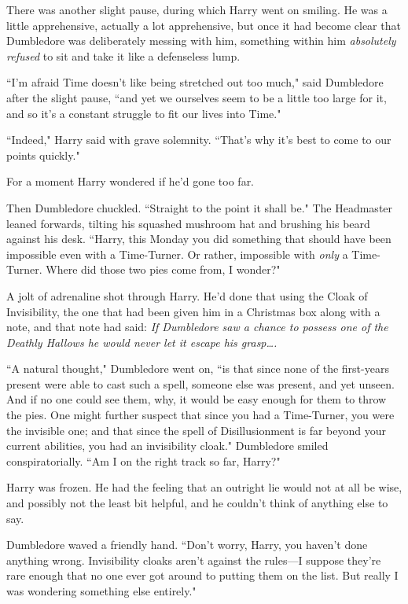 There was another slight pause, during which Harry went on smiling. He was a little apprehensive, actually a lot apprehensive, but once it had become clear that Dumbledore was deliberately messing with him, something within him \emph{absolutely refused} to sit and take it like a defenseless lump.

``I'm afraid Time doesn't like being stretched out too much," said Dumbledore after the slight pause, ``and yet we ourselves seem to be a little too large for it, and so it's a constant struggle to fit our lives into Time."

``Indeed," Harry said with grave solemnity. ``That's why it's best to come to our points quickly."

For a moment Harry wondered if he'd gone too far.

Then Dumbledore chuckled. ``Straight to the point it shall be." The Headmaster leaned forwards, tilting his squashed mushroom hat and brushing his beard against his desk. ``Harry, this Monday you did something that should have been impossible even with a Time-Turner. Or rather, impossible with \emph{only} a Time-Turner. Where did those two pies come from, I wonder?"

A jolt of adrenaline shot through Harry. He'd done that using the Cloak of Invisibility, the one that had been given him in a Christmas box along with a note, and that note had said: \emph{If Dumbledore saw a chance to possess one of the Deathly Hallows he would never let it escape his grasp{\ldots}.}

``A natural thought," Dumbledore went on, ``is that since none of the first-years present were able to cast such a spell, someone else was present, and yet unseen. And if no one could see them, why, it would be easy enough for them to throw the pies. One might further suspect that since you had a Time-Turner, you were the invisible one; and that since the spell of Disillusionment is far beyond your current abilities, you had an invisibility cloak." Dumbledore smiled conspiratorially. ``Am I on the right track so far, Harry?"

Harry was frozen. He had the feeling that an outright lie would not at all be wise, and possibly not the least bit helpful, and he couldn't think of anything else to say.

Dumbledore waved a friendly hand. ``Don't worry, Harry, you haven't done anything wrong. Invisibility cloaks aren't against the rules—I suppose they're rare enough that no one ever got around to putting them on the list. But really I was wondering something else entirely."

